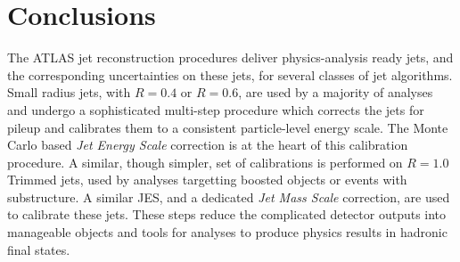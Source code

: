 
\section{Conclusions}

The ATLAS jet reconstruction procedures deliver physics-analysis ready jets, and the corresponding uncertainties on these jets, for several classes of jet algorithms. Small radius jets, with $R=0.4$ or $R=0.6$, are used by a majority of analyses and undergo a sophisticated multi-step procedure which corrects the jets for pileup and calibrates them to a consistent particle-level energy scale. The Monte Carlo based \textit{Jet Energy Scale} correction is at the heart of this calibration procedure. A similar, though simpler, set of calibrations is performed on $R=1.0$ Trimmed jets, used by analyses targetting boosted objects or events with substructure. A similar JES, and a dedicated \textit{Jet Mass Scale} correction, are used to calibrate these \largeR jets. These steps reduce the complicated detector outputs into manageable objects and tools for analyses to produce physics results in hadronic final states.
